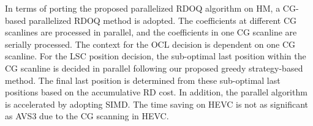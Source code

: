 \documentclass[lettersize,journal]{IEEEtran}
\begin{document}


In terms of porting the proposed parallelized RDOQ algorithm on HM, a CG-based parallelized RDOQ method is adopted. The coefficients at different CG scanlines are processed in parallel, and the coefficients in one CG scanline are serially processed. The context for the OCL decision is dependent on one CG scanline. For the LSC position decision, the sub-optimal last position within the CG scanline is decided in parallel following our proposed greedy strategy-based method. The final last position is determined from these sub-optimal last positions based on the accumulative RD cost. In addition, the parallel algorithm is accelerated by adopting SIMD. The time saving on HEVC is not as significant as AVS3 due to the CG scanning in HEVC. 
\end{document}
